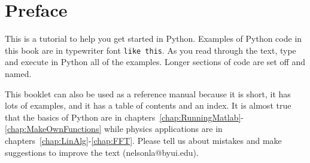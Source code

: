 \chapter*{Preface}

This is a tutorial to help you get started in Python. Examples of
Python code in this book are in typewriter font {\tt like
this}. As you read through the text, type and execute in Python all
of the examples. Longer sections of code
are set off and named.  

This booklet can also be used as a reference manual because it is
short, it has lots of examples, and it has a table of contents and
an index. It is almost true that the basics of Python are in
chapters~\ref{chap:RunningMatlab}-\ref{chap:MakeOwnFunctions} while
physics applications are in
chapters~\ref{chap:LinAlg}-\ref{chap:FFT}. Please tell us about
mistakes and make suggestions to improve the text
(nelsonla@byui.edu).

